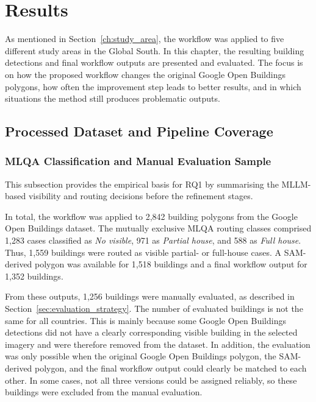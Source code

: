 \chapter{Results}
\label{08_ergebnisse}

As mentioned in Section~\ref{ch:study_area}, the workflow was applied to five different study areas in the Global South. In this chapter, the resulting building detections and final workflow outputs are presented and evaluated. The focus is on how the proposed workflow changes the original Google Open Buildings polygons, how often the improvement step leads to better results, and in which situations the method still produces problematic outputs.

\section{Processed Dataset and Pipeline Coverage}

\subsection{MLQA Classification and Manual Evaluation Sample}

This subsection provides the empirical basis for RQ1 by summarising the MLLM-based visibility and routing decisions before the refinement stages.

In total, the workflow was applied to 2,842 building polygons from the Google Open Buildings dataset. The mutually exclusive MLQA routing classes comprised 1,283 cases classified as \textit{No visible}, 971 as \textit{Partial house}, and 588 as \textit{Full house}. Thus, 1,559 buildings were routed as visible partial- or full-house cases. A SAM-derived polygon was available for 1,518 buildings and a final workflow output for 1,352 buildings.

From these outputs, 1,256 buildings were manually evaluated, as described in Section~\ref{sec:evaluation_strategy}. The number of evaluated buildings is not the same for all countries. This is mainly because some Google Open Buildings detections did not have a clearly corresponding visible building in the selected imagery and were therefore removed from the dataset. In addition, the evaluation was only possible when the original Google Open Buildings polygon, the SAM-derived polygon, and the final workflow output could clearly be matched to each other. In some cases, not all three versions could be assigned reliably, so these buildings were excluded from the manual evaluation.

